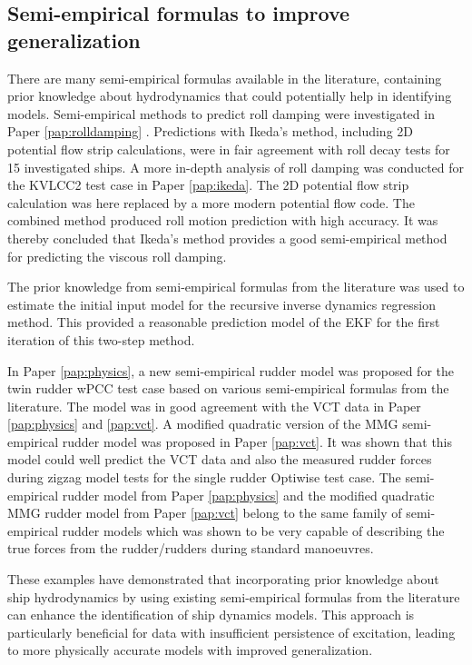 \subsection*{Semi-empirical formulas to improve generalization}
There are many semi-empirical formulas available in the literature, containing prior knowledge about hydrodynamics that could potentially help in identifying models.       
Semi-empirical methods to predict roll damping were investigated in Paper \ref{pap:rolldamping} . Predictions with Ikeda's method, including 2D potential flow strip calculations, were in fair agreement with roll decay tests for 15 investigated ships. 
A more in-depth analysis of roll damping was conducted for the KVLCC2 test case in Paper \ref{pap:ikeda}. The 2D potential flow strip calculation was here replaced by a more modern potential flow code. The combined method produced roll motion prediction with high accuracy. It was thereby concluded that Ikeda's method provides a good semi-empirical method for predicting the viscous roll damping.

The prior knowledge from semi-empirical formulas from the literature was used to estimate the initial input model for the recursive inverse dynamics regression method. This provided a reasonable prediction model of the EKF for the first iteration of this two-step method.

In Paper \ref{pap:physics}, a new semi-empirical rudder model was proposed for the twin rudder wPCC test case based on various semi-empirical formulas from the literature. The model was in good agreement with the VCT data in Paper \ref{pap:physics} and \ref{pap:vct}. 
A modified quadratic version of the MMG semi-empirical rudder model was proposed in Paper \ref{pap:vct}. 
It was shown that this model could well predict the VCT data and also the measured rudder forces during zigzag model tests for the single rudder Optiwise test case. 
The semi-empirical rudder model from Paper \ref{pap:physics} and the modified quadratic MMG rudder model from Paper \ref{pap:vct} belong to the same family of semi-empirical rudder models which was shown to be very capable of describing the true forces from the rudder/rudders during standard manoeuvres. 

These examples have demonstrated that incorporating prior knowledge about ship hydrodynamics by using existing semi-empirical formulas from the literature can enhance the identification of ship dynamics models. This approach is particularly beneficial for data with insufficient persistence of excitation, leading to more physically accurate models with improved generalization. 